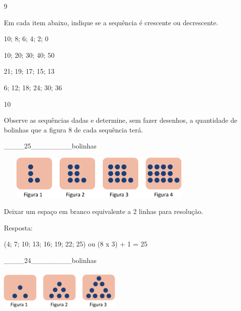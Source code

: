 \num{9}

Em cada item abaixo, indique se a sequência é crescente ou decrescente.

\begin{escolha}

\item
  10; 8; 6; 4; 2; 0

\item
  10; 20; 30; 40; 50

\item
  21; 19; 17; 15; 13

\item
  6; 12; 18; 24; 30; 36

\end{escolha}

\num{10}

Observe as sequências dadas e determine, sem fazer desenhos, a
quantidade de bolinhas que a figura 8 de cada sequência terá.

\begin{escolha}

\item
  \_\_\_\_25\_\_\_\_\_\_\_\_bolinhas
\end{escolha}

\includegraphics[width=4.09202in,height=0.85841in]{media/image32.png}

Deixar um espaço em branco equivalente a 2 linhas para resolução.

Resposta:

(4; 7; 10; 13; 16; 19; 22; 25) ou (8 x 3) + 1 = 25

\begin{escolha}

\item
  \_\_\_\_24\_\_\_\_\_\_\_\_bolinhas
\end{escolha}

\includegraphics[width=2.38354in,height=0.81674in]{media/image33.png}


